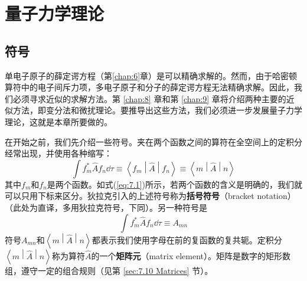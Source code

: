 \chapter{量子力学理论}
\label{chap:7}
\section{符号}
\label{sec:7.1 Notation}
    单电子原子的薛定谔方程（第\ref{chap:6}章）是可以精确求解的。然而，由于哈密顿算符中的电子间斥力项，多电子原子和分子的薛定谔方程无法精确求解。因此，我们必须寻求近似的求解方法。第 \ref{chap:8} 章和第 \ref{chap:9} 章将介绍两种主要的近似方法，即变分法和微扰理论。要推导出这些方法，我们必须进一步发展量子力学理论，这就是本章所要做的。

    在开始之前，我们先介绍一些符号。夹在两个函数之间的算符在全空间上的定积分经常出现，并使用各种缩写：
    \begin{equation}
        \int f^{\ast}_m\hat{A}f_n\dd \tau \equiv \left\langle f_m \middle| \hat{A} \middle| f_n \right\rangle \equiv \left\langle m \middle| \hat{A} \middle| n \right\rangle
        \label{eq:7.1}
    \end{equation}
    其中$f_m$和$f_n$是两个函数。如式(\ref{eq:7.1})所示，若两个函数的含义是明确的，我们就可以只用下标来区分。狄拉克引入的上述符号称为\textbf{括号符号}（bracket notation）（此处为直译，多用狄拉克符号，下同）。另一种符号是
    \begin{equation}
        \int f^{\ast}_m\hat{A}f_n\dd \tau \equiv A_{mn}
        \label{eq:7.2}
    \end{equation}
    符号$A_{mn}$和$\left\langle m \middle| \hat{A} \middle| n \right\rangle$都表示我们使用字母在前的复函数的复共轭。定积分$\left\langle m \middle| \hat{A} \middle| n \right\rangle$称为算符$\hat{A}$的一个\textbf{矩阵元}（matrix element）。矩阵是数字的矩形数组，遵守一定的组合规则（见第 \ref{sec:7.10 Matrices} 节）。


